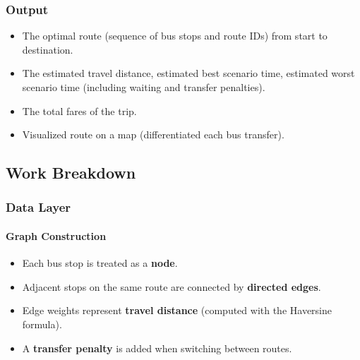 \subsubsection{Output}
\begin{itemize}
    \item The optimal route (sequence of bus stops and route IDs) from start to destination.
    \item The estimated travel distance, estimated best scenario time, estimated worst scenario time (including waiting and transfer penalties).
    \item The total fares of the trip.
    \item  Visualized route on a map (differentiated each bus transfer).
\end{itemize}


\subsection{Work Breakdown}

\subsubsection{Data Layer}


\paragraph{Graph Construction}
\begin{itemize}
  \item Each bus stop is treated as a \textbf{node}.
  \item Adjacent stops on the same route are connected by \textbf{directed edges}.
  \item Edge weights represent \textbf{travel distance} (computed with the Haversine formula).
  \item A \textbf{transfer penalty} is added when switching between routes.
\end{itemize}

